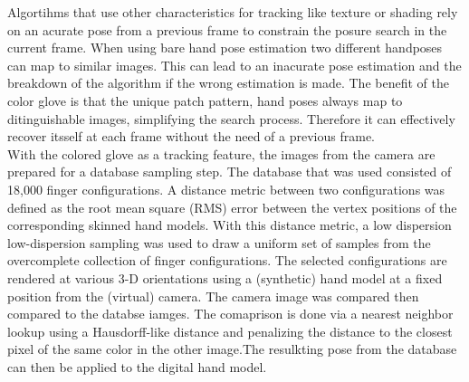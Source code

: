Algortihms that use other characteristics for tracking like texture or shading \cite{LaGorce.2008} rely on an acurate pose from a previous frame to constrain the posure search in the current frame. When using bare hand pose estimation two different handposes can map to similar images. This can lead to an inacurate pose estimation and the breakdown of the algorithm if the wrong estimation is made.
The benefit of the color glove is that the unique patch pattern, hand poses always map to ditinguishable images, simplifying the search process. Therefore it can effectively recover itsself at each frame without the need of a previous frame.\\
With the colored glove as a tracking feature, the images from the camera are prepared for a database sampling step. The database that was used consisted of 18,000 finger configurations. A distance metric between two configurations was defined as the root mean square (RMS) error between the vertex positions of the corresponding skinned hand models. With this distance metric, a low dispersion low-dispersion sampling was used to draw a uniform set of samples from the overcomplete collection of finger configurations.
The selected configurations are rendered at various 3-D orientations using a (synthetic) hand model at a fixed position from the (virtual) camera.
The camera image was compared then compared to the databse iamges. The comaprison is done via a nearest neighbor lookup using a Hausdorff-like distance\cite{Huttenlocher.1993} and penalizing the distance to the closest pixel of the same color in the other image.The resulkting pose from the database can then be applied to the digital hand model.

